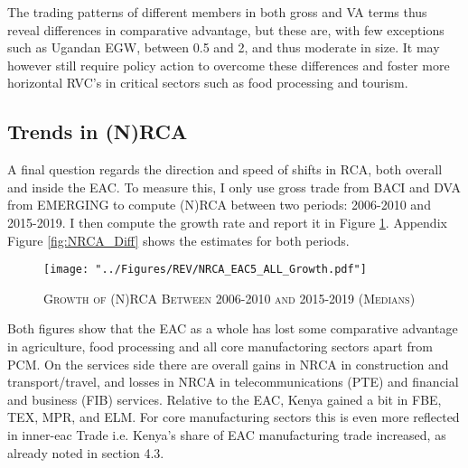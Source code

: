 \documentclass[a4paper]{article}
\begin{document}
The trading patterns of different members in both gross and VA terms thus reveal differences in comparative advantage, but these are, with few exceptions such as Ugandan EGW, between 0.5 and 2, and thus moderate in size. It may however still require policy action to overcome these differences and foster more horizontal RVC's in critical sectors such as food processing and tourism. 

\subsection{Trends in (N)RCA}

A final question regards the direction and speed of shifts in RCA, both overall and inside the EAC. To measure this, I only use gross trade from BACI and DVA from EMERGING to compute (N)RCA between two periods: 2006-2010 and 2015-2019. I then compute the growth rate and report it in Figure \ref{fig:NRCA_GR}. Appendix Figure \ref{fig:NRCA_Diff} shows the estimates for both periods. 

\begin{figure}[h!]
\centering
\caption{\label{fig:NRCA_GR}\textsc{Growth of (N)RCA Between 2006-2010 and 2015-2019 (Medians)}}
\texttt{[image: "../Figures/REV/NRCA\_EAC5\_ALL\_Growth.pdf"]} %
\end{figure}
\FloatBarrier

Both figures show that the EAC as a whole has lost some comparative advantage in agriculture, food processing and all core manufactoring sectors apart from PCM. On the services side there are overall gains in NRCA in construction and transport/travel, and losses in NRCA in telecommunications (PTE) and financial and business (FIB) services. Relative to the EAC, Kenya gained a bit in FBE, TEX, MPR, and ELM. For core manufacturing sectors this is even more reflected in inner-eac Trade i.e. Kenya's share of EAC manufacturing trade increased, as already noted in section 4.3. 
\end{document}
